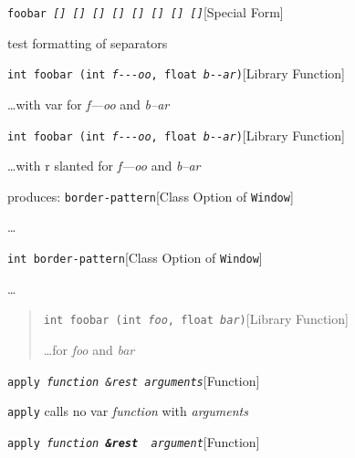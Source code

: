 \documentclass{book}
\begin{document}
%
\noindent\texttt{foobar \EmbracOn{}\textsl{[] \EmbracOff{}\textnormal{[]}\EmbracOn{} \EmbracOff{}\textsl{[]}\EmbracOn{} \EmbracOff{}\texttt{[]}\EmbracOn{} \EmbracOff{}\texttt{[]}\EmbracOn{} \EmbracOff{}\textnormal{\textsl{[]}}\EmbracOn{} \EmbracOff{}\textnormal{\texttt{[]}}\EmbracOn{} \EmbracOff{}\textnormal{\texttt{\textsl{[]}}}\EmbracOn{}}}\hfill[Special Form]



%
test formatting of separators

\noindent\texttt{int foobar (int \textsl{f{-}{-}{-}oo}, float \textsl{b{-}{-}ar})}\hfill[Library Function]



%
\dots{}\@ with var for \textsl{f---oo} and \textsl{b--ar}

\noindent\texttt{int foobar (int \textnormal{\textsl{f{-}{-}{-}oo}}, float \textnormal{\textsl{b{-}{-}ar}})}\hfill[Library Function]



%
\dots{}\@ with r slanted for \textsl{f---oo} and \textsl{b--ar}

\noindent{}produces:
\noindent\texttt{border-pattern}\hfill[Class Option of \texttt{Window}]



%
\dots{}\@

\noindent\texttt{\texttt{int} border-pattern}\hfill[Class Option of \texttt{Window}]



%
\dots{}\@

\begin{quote}
\noindent\texttt{int foobar (int \textsl{foo}, float \textsl{bar})}\hfill[Library Function]



%
\dots{}\@ for \textsl{foo} and \textsl{bar}
\end{quote}

\noindent\texttt{apply \EmbracOn{}\textsl{function \&rest arguments}}\hfill[Function]



%
\texttt{apply} calls no var \textsl{function} with \textsl{arguments}

\noindent\texttt{apply \EmbracOn{}\textsl{function \EmbracOff{}\textnormal{\textbf{\&rest }}\EmbracOn{} argument}}\hfill[Function]
\end{document}
